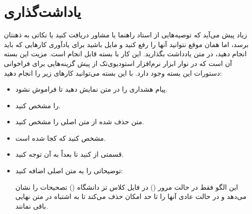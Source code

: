 \section{یاداشت‌گذاری}
زیاد پیش می‌آید که توصیه‌هایی از استاد راهنما یا مشاور دریافت کنید یا نکاتی به ذهنتان برسد، اما همان موقع نتوانید آنها را رفع کنید و مایل باشید برای یادآوری کارهایی که باید انجام دهید، در متن یادداشت بگذارید. این کار با بسته  قابل انجام است. مزیت این بسته آن است که در نوار ابزار نرم‌افزار استودیوی‌تک%
از پیش گزینه‌هایی برای فراخوانی دستورات این بسته وجود دارد. با این بسته می‌توانید کارهای زیر را انجام دهید:

\begin{itemize}
\item 
پیام 
\alert{%
هشداری} را در متن نمایش دهید تا فراموش نشود.
\item 
{} را مشخص کنید.
\item 
متن حذف شده از متن اصلی
 را مشخص کنید. 
\item
مشخص کنید که کجا 
 شده است.
\item
قسمتی از
 کنید تا بعداً به آن توجه کنید.
\item 
توضیحاتی را به متن اصلی اضافه کنید: 

این الگو فقط در حالت مرور 
() 
در فایل کلاس تز دانشگاه
() 
تصحیحات را نشان می‌دهد و در حالت عادی آنها را تا حد امکان حذف می‌کند تا به اشتباه در متن نهایی 
\thesis 
باقی نمانند.
\end{itemize}


